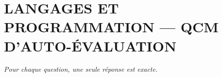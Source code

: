 
\section*{\textcolor{chapcolor}{\MakeUppercase{Langages et programmation — QCM d'auto-évaluation}}}

\begin{center}
\textit{Pour chaque question, une seule réponse est exacte.}
\end{center}

